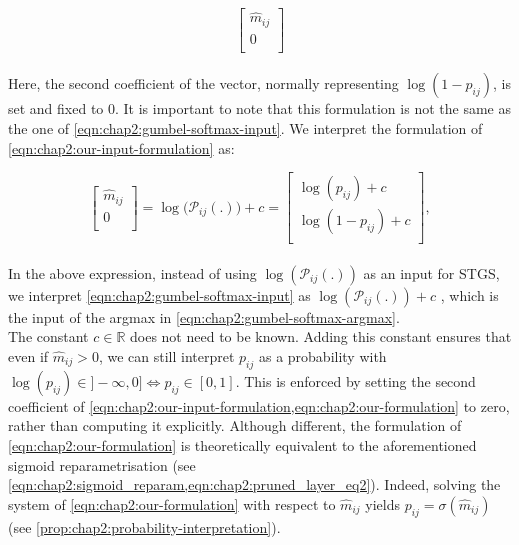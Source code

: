 \begin{equation}
  \label{eqn:chap2:our-input-formulation}
  \begin{bmatrix}
    \hat{m}_{ij} \\
    0                 \\
  \end{bmatrix}
\end{equation}\\

Here, the second coefficient of the vector, normally representing
$\log(1-p_{ij})$, is set and fixed to 0. It is important to note that this
formulation is not the same as the one of \cref{eqn:chap2:gumbel-softmax-input}.
We interpret the formulation of \cref{eqn:chap2:our-input-formulation} as:

\begin{equation}
  \label{eqn:chap2:our-formulation}
  \begin{bmatrix}
    \hat{m}_{ij} \\
    0                 \\
  \end{bmatrix}
  = \log\big(\mathcal{P}_{ij}(.)\big) + c =
  \begin{bmatrix}
    \log(p_{ij}) + c   \\
    \log(1-p_{ij}) + c \\
  \end{bmatrix},
\end{equation}\\

\noindent In the above expression, instead of using $\log(\mathcal{P}_{ij}(.))$
as an input for \ac{STGS}, we interpret \cref{eqn:chap2:gumbel-softmax-input} as
$\log(\mathcal{P}_{ij}(.)) + c$ , which is the input of the argmax in
\cref{eqn:chap2:gumbel-softmax-argmax}.\\

The constant $c \in \mathds{R}$ does not need to be known. Adding this constant
ensures that even if $\hat{m}_{ij} > 0$, we can still interpret $p_{ij}$ as
a probability with $\log(p_{ij}) \in ]-\infty,0] \Leftrightarrow p_{ij} \in
[0,1]$. This is enforced by setting the second coefficient of
\cref{eqn:chap2:our-input-formulation,eqn:chap2:our-formulation}  to zero,
rather than computing it explicitly. Although different, the formulation of
\cref{eqn:chap2:our-formulation} is theoretically equivalent to the
aforementioned sigmoid reparametrisation (see
\cref{eqn:chap2:sigmoid_reparam,eqn:chap2:pruned_layer_eq2}). Indeed, solving
the system of \cref{eqn:chap2:our-formulation} with respect to
$\hat{m}_{ij}$ yields $p_{ij} = \sigma(\hat{m}_{ij})$ (see
\cref{prop:chap2:probability-interpretation}). \\

